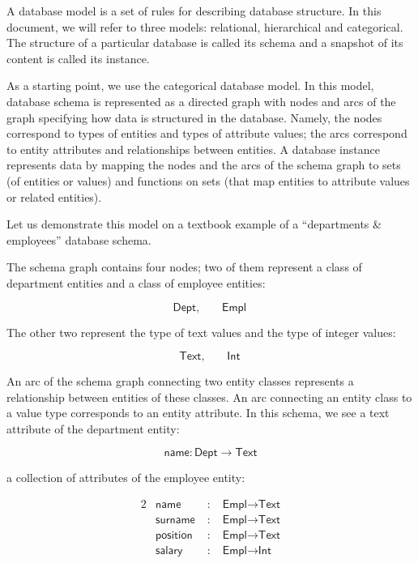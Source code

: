 A database model is a set of rules for describing database structure.  In this
document, we will refer to three models: relational, hierarchical and
categorical.  The structure of a particular database is called its schema and a
snapshot of its content is called its instance.

As a starting point, we use the categorical database model.  In this model,
database schema is represented as a directed graph with nodes and arcs of the
graph specifying how data is structured in the database.  Namely, the nodes
correspond to types of entities and types of attribute values; the arcs
correspond to entity attributes and relationships between entities.  A database
instance represents data by mapping the nodes and the arcs of the schema graph
to sets (of entities or values) and functions on sets (that map entities to
attribute values or related entities).

Let us demonstrate this model on a textbook example of a ``departments \&
employees'' database schema.

The schema graph contains four nodes; two of them represent a class of
department entities and a class of employee entities:

\begin{equation*}
\textsf{Dept}, \qquad \textsf{Empl}
\end{equation*}

The other two represent the type of text values and the type of integer values:

\begin{equation*}
\textsf{Text}, \qquad \textsf{Int}
\end{equation*}

An arc of the schema graph connecting two entity classes represents a
relationship between entities of these classes.  An arc connecting an entity
class to a value type corresponds to an entity attribute.  In this schema, we
see a text attribute of the department entity:

\begin{equation*}
\textsf{name} : \textsf{Dept} \to \textsf{Text}
\end{equation*}

a collection of attributes of the employee entity:

\begin{alignat*}{2}
& \textsf{name} & \;:\; & \textsf{Empl} \to \textsf{Text} \\
& \textsf{surname} & \;:\; & \textsf{Empl} \to \textsf{Text} \\
& \textsf{position} & \;:\; & \textsf{Empl} \to \textsf{Text} \\
& \textsf{salary} & \;:\; & \textsf{Empl} \to \textsf{Int}
\end{alignat*}

